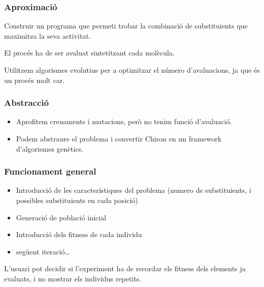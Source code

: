 \documentclass{beamer}
\begin{document}
\begin{frame}
	\frametitle{Aproximació}
	Construir un programa que permeti trobar la combinació de substituients que
	maximitza la seva activitat.

	El procés ha de ser avaluat sintetitzant cada molècula.

	Utilitzem algorismes evolutius per a optimitzar el número d'avaluacions, ja
	que és un procés molt car.


\end{frame}

\begin{frame}
	\frametitle{Abstracció}
	\begin{itemize}
	\item Aprofitem creuaments i mutacions, però no tenim funció d'avaluació.
	\pause
	\item Podem abstraure el problema i convertir Chiron en un framework
	d'algorismes genètics.
	\end{itemize}
\end{frame}

\begin{frame}
\frametitle{Funcionament general}
\begin{itemize}
\item Introducció de les característiques del problema (numero de substituients,
i possibles substituients en cada posició)
\item Generació de població inicial
\item Introducció dels fitness de cada individu
\item següent iteració\ldots
\end{itemize}
\pause
L'usuari pot decidir si l'experiment ha de recordar els fitness dels elements ja
evaluats, i no mostrar els individus repetits.
\end{frame}
\end{document}
